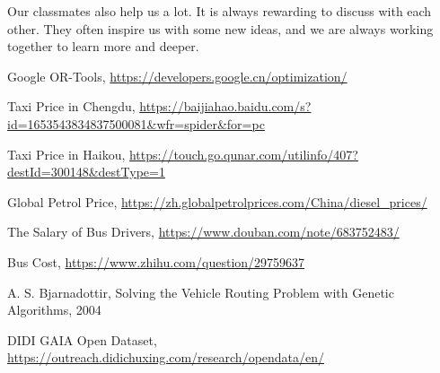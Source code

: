 \documentclass{llncs}
\begin{document}
Our classmates also help us a lot. It is always rewarding to discuss with each other. They often inspire us with some new ideas, and we are always working together to learn more and deeper.

%
%
%
% 
% 
%
\begin{thebibliography}{8}
Google OR-Tools, \url{https://developers.google.cn/optimization/}

Taxi Price in Chengdu, \url{https://baijiahao.baidu.com/s?id=1653543834837500081&wfr=spider&for=pc}

Taxi Price in Haikou, \url{https://touch.go.qunar.com/utilinfo/407?destId=300148&destType=1}

Global Petrol Price, \url{https://zh.globalpetrolprices.com/China/diesel_prices/}

The Salary of Bus Drivers, \url{https://www.douban.com/note/683752483/}

Bus Cost, \url{https://www.zhihu.com/question/29759637}

A. S. Bjarnadottir, Solving the Vehicle Routing Problem with Genetic Algorithms, 2004

DIDI GAIA Open Dataset, \url{https://outreach.didichuxing.com/research/opendata/en/}

\end{thebibliography}
\end{document}
